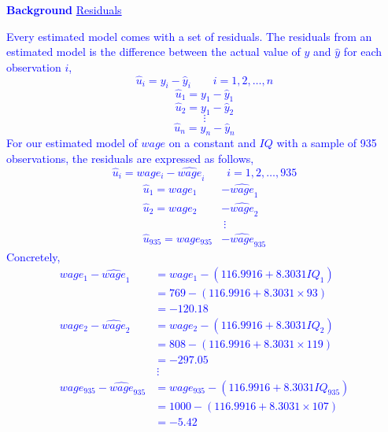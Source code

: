 \documentclass[12pt]{report}
\newenvironment{blueframed}[1][blue]
{\def\FrameCommand{\fboxsep=\FrameSep\fcolorbox{#1}{white}}%
\MakeFramed {\advance\hsize-\width \FrameRestore}}
{\endMakeFramed}
\begin{document}
\begin{blueframed}
	\textcolor{blue}{\textbf{Background}}
	\vspace{-\baselineskip}
	\justify
	\textcolor{blue}{\underline{Residuals}}
	
	\noindent \textcolor{blue}
	{
		Every estimated model comes with a set of residuals. The residuals from an estimated model is the difference between the actual value of $y$ and $\hat{y}$ for each observation $i$,
		$$\hat{u}_i = y_i-\hat{y}_i \qquad i=1,2,\dots,n$$
	}
	\textcolor{blue}
	{
		$$\hat{u}_1 = y_1-\hat{y}_1$$
		$$\hat{u}_2 = y_1-\hat{y}_2$$
		$$\vdots$$
		$$\hat{u}_n = y_n-\hat{y}_n$$
		For our estimated model of $wage$ on a constant and $IQ$ with a sample of 935 observations, the residuals are expressed as follows,
		$$\hat{u}_i = wage_i-\widehat{wage}_i \qquad i=1,2,\dots,935$$
		\begin{align*}
		\hat{u}_1 = wage_1&-\widehat{wage}_1 \\
		\hat{u}_2 = wage_2&-\widehat{wage}_2 \\
		&\ \vdots \\
		\hat{u}_{935} = wage_{935}&-\widehat{wage}_{935}
		\end{align*}
		Concretely,
		\begin{align*}
		wage_1-\widehat{wage}_1 &= wage_1 - (116.9916+8.3031IQ_1) \\
		&= 769-(116.9916+8.3031\times93) \\
		&= -120.18 \\
		wage_2-\widehat{wage}_2 &= wage_2 - (116.9916+8.3031IQ_2) \\
		&= 808-(116.9916+8.3031\times119) \\
		&= -297.05 \\
		&\ \vdots \\
		wage_{935}-\widehat{wage}_{935} &= wage_{935} - (116.9916+8.3031IQ_{935}) \\
		&= 1000-(116.9916+8.3031\times107) \\
		&= -5.42 
		\end{align*}
	}
\end{blueframed}
\end{document}
